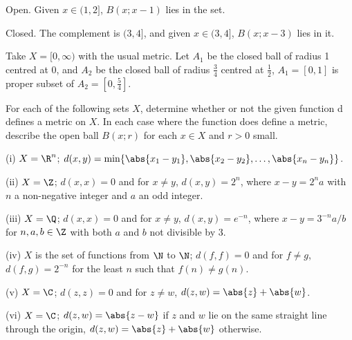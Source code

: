 \item [(d)] Open. Given $x\in (1,2]$, $B(x;x-1)$ lies in the set. 

Closed. The complement is $(3,4]$, and given $x\in(3,4]$, $B(x;x-3)$ lies in it.
\een
\item [(ii)] Take $X=[0,\infty)$ with the usual metric. Let $A_1$ be the closed ball of radius 1 centred at 0, and $A_2$ be the closed ball of radius $\tfrac 34$ centred at $\frac 12$, $A_1=[0,1]$ is proper subset of $A_2 = [0,\frac 54]$.
\een

\begin{exercise}\label{ques:open_ball} 
For each of the following sets $X$, determine whether or not the given function d defines a metric on $X$. In each case where the function does define a metric, describe the open ball $B(x;r)$ for each $x \in X$ and $r > 0$ small.
\ben
\item [(i)] $X = \R^n$; $d(x, y) = \min\{\abs{x_1 -y_1}, \abs{x_2 - y_2},\dots,\abs{x_n - y_n}\}$.
\item [(ii)] $X = \Z$; $d(x, x) = 0$ and for $x \neq y$, $d(x, y) = 2^n$, where $x - y = 2^n a$ with $n$ a non-negative integer and $a$ an odd integer.
\item [(iii)] $X = \Q$; $d(x, x) = 0$ and for $x \neq y$, $d(x, y) = e^{-n}$, where $x - y = 3^{-n}a/b$ for $n, a, b \in \Z$ with both $a$ and $b$ not divisible by 3.
\item [(iv)] $X$ is the set of functions from $\N$ to $\N$; $d(f, f) = 0$ and for $f \neq g$, $d(f, g) = 2^{-n}$ for the least $n$ such that $f(n) \neq g(n)$.
\item [(v)] $X = \C$; $d(z, z) = 0$ and for $z \neq w$, $d(z,w) = \abs{z} + \abs{w}$.
\item [(vi)] $X = \C$; $d(z,w) = \abs{z - w}$ if $z$ and $w$ lie on the same straight line through the origin, $d(z,w) = \abs{z} + \abs{w}$ otherwise.
\een
\end{exercise}

